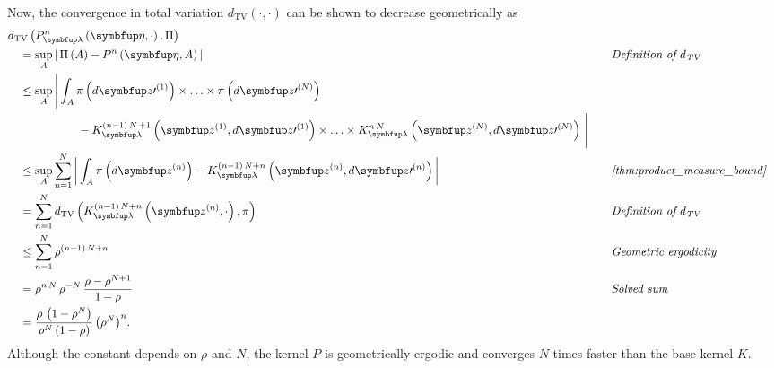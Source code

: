 \begin{proofEnd}
  Now, the convergence in total variation \(d_{\mathrm{TV}}\left(\cdot, \cdot\right)\) can be shown to decrease geometrically as
  \begin{alignat}{2}
    &\DTV{P_{\vlambda}^{n}\left(\veta, \cdot\right)}{\Pi}
    \nonumber
    \\
    &\quad=
    \sup_{A}
    \abs{
      \Pi\left(A\right)
      -
      P^{n}\left(\veta, A\right)
    }
    &&\quad\text{\textit{Definition of \(d_{\text{TV}}\)}}
    \nonumber
    \\
    &\quad\leq
    \sup_{A}
    \Bigg|
    \int_{A}
      \pi\left(d\vz\prime^{(1)}\right) \times \ldots \times \pi\left(d\vz\prime^{(N)}\right)
    \nonumber
      \\
      &\qquad\qquad\qquad-
      K^{(n-1)\,N\,+1}_{\vlambda}\left(\vz^{(1)}, d\vz\prime^{(1)}\right) \times \ldots \times K^{n\,N}_{\vlambda}\left(\vz^{(N)}, d\vz\prime^{(N)}\right)
    \,\Bigg|
    \nonumber
    \\
    &\quad\leq
    \sup_{A}
    \sum_{n=1}^N
    \abs{
    \int_{A}
      \pi\left(d\vz^{(n)}\right) - K^{(n-1)\,N + n}_{\vlambda}\left(\vz^{(n)}, d\vz\prime^{(n)}\right) 
    }
    &&\quad\text{\textit{\cref{thm:product_measure_bound}}}
    \nonumber
    \\
    &\quad=
    \sum_{n=1}^N
    \DTV{K^{(n-1)\,N + n}_{\vlambda}\left(\vz^{(n)}, \cdot\right)}{\pi}
    &&\quad\text{\textit{Definition of \(d_{\text{TV}}\)}}
    \nonumber
    \\
    &\quad\leq
    \sum_{n=1}^N
    \rho^{(n-1)\,N + n}
    &&\quad\text{\textit{Geometric ergodicity}}
    \nonumber
    \\
    &\quad=
    \rho^{n\,N}
    \,
    \rho^{-N}
    \,
    \frac{\rho - \rho^{N+1}}{1 - \rho}
    &&\quad\text{\textit{Solved sum}}
    \nonumber
    \\
    &\quad=
    \frac{\rho \, \left(1 - \rho^N\right)}{\rho^N \left(1 - \rho\right)}
    \,
    {\left( \rho^{N} \right)}^n.
    \nonumber
  \end{alignat}
  Although the constant depends on \(\rho\) and \(N\), the kernel \(P\) is geometrically ergodic and converges \(N\) times faster than the base kernel \(K\).


\end{proofEnd}
